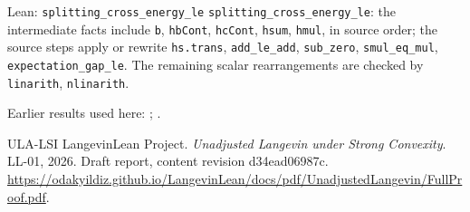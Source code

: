 \documentclass[11pt,a4paper]{article}
\begin{document}
\begin{leanbox}{Lean: \texttt{splitting\_\allowbreak{}cross\_\allowbreak{}energy\_\allowbreak{}le}}
\texttt{splitting\_\allowbreak{}cross\_\allowbreak{}energy\_\allowbreak{}le}: the intermediate facts include \texttt{b}, \texttt{hb\allowbreak{}Cont}, \texttt{hc\allowbreak{}Cont}, \texttt{hsum}, \texttt{hmul}, in source order; the source steps apply or rewrite \texttt{hs.\allowbreak{}trans}, \texttt{add\_\allowbreak{}le\_\allowbreak{}add}, \texttt{sub\_\allowbreak{}zero}, \texttt{smul\_\allowbreak{}eq\_\allowbreak{}mul}, \texttt{expectation\_\allowbreak{}gap\_\allowbreak{}le}. The remaining scalar rearrangements are checked by \texttt{linarith}, \texttt{nlinarith}.
\end{leanbox}


Earlier results used here: \cite[Section~3.13.2]{LangevinLean2026ULASC}; \cite[Section~3.13.5]{LangevinLean2026ULASC}.

\begin{thebibliography}{ULA-LSI}
LangevinLean Project. \emph{Unadjusted Langevin under Strong Convexity}. LL-01, 2026. Draft report, content revision d34ead06987c. \url{https://odakyildiz.github.io/LangevinLean/docs/pdf/UnadjustedLangevin/FullProof.pdf}.
\end{thebibliography}
\end{document}
